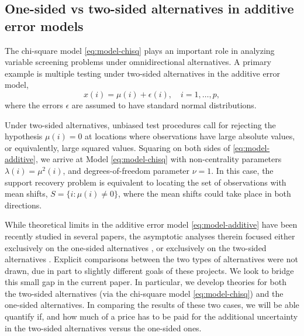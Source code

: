 \subsection{One-sided vs two-sided alternatives in additive error models}
\label{subsec:motivation-additive}

The chi-square model \eqref{eq:model-chisq} plays an important role in analyzing variable screening problems under omnidirectional alternatives.
A primary example is multiple testing under two-sided alternatives in the additive error model,
\begin{equation} \label{eq:model-additive}
    x(i) = \mu(i) + \epsilon(i), \quad i=1,\ldots,p,
\end{equation}
where the errors $\epsilon$ are assumed to have standard normal distributions.

Under two-sided alternatives, unbiased test procedures call for rejecting the hypothesis $\mu(i)=0$ at locations where observations have large absolute values, or equivalently, large squared values.
Squaring on both sides of \eqref{eq:model-additive}, we arrive at Model \eqref{eq:model-chisq} with non-centrality parameters $\lambda(i) = \mu^2(i)$, and degrees-of-freedom parameter $\nu =1$.
In this case, the support recovery problem is equivalent to locating the set of observations with mean shifts, $S=\{i:\mu(i)\neq 0\}$, where the mean shifts could take place in both directions.

While theoretical limits in the additive error model \eqref{eq:model-additive} have been recently studied in several papers, the asymptotic analyses therein focused either exclusively on the one-sided alternatives \cite{arias2017distribution, gao2018fundamental}, or exclusively on the two-sided alternatives \cite{butucea2018variable}.
Explicit comparisons between the two types of alternatives were not drawn, due in part to slightly different goals of these projects. We look to bridge this small gap in the current paper. 
In particular, we develop theories for both the two-sided alternatives (via the chi-square model \eqref{eq:model-chisq}) and the one-sided alternatives.
In comparing the results of these two cases, we will be able quantify if, and how much of a price has to be paid for the additional uncertainty in the two-sided alternatives versus the one-sided ones.


